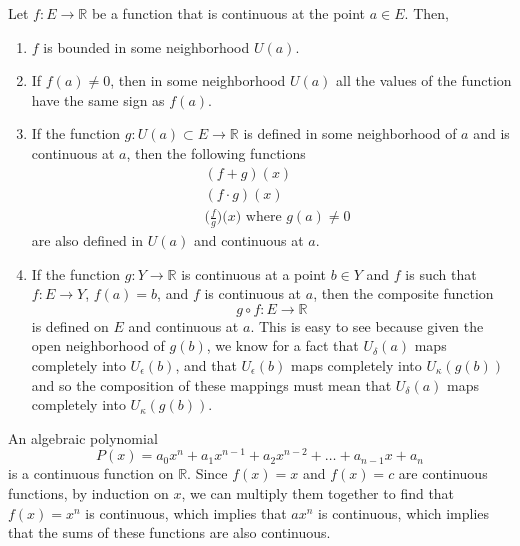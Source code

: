   \begin{theorem}
    Let $f: E \longrightarrow \mathbb{R}$ be a function that is continuous at the point $a \in E$. Then, 
    \begin{enumerate}
      \item $f$ is bounded in some neighborhood $U(a)$. 
      \item If $f(a) \neq 0$, then in some neighborhood $U(a)$ all the values of the function have the same sign as $f(a)$. 
      \item If the function $g: U(a) \subset E \longrightarrow \mathbb{R}$ is defined in some neighborhood of $a$ and is continuous at $a$, then the following functions 
      \begin{align*}
        & (f + g) (x) \\
        & (f \cdot g) (x) \\
        & \bigg( \frac{f}{g} \bigg) \big( x \big) \text{ where } g(a) \neq 0
      \end{align*}
      are also defined in $U(a)$ and continuous at $a$. 
      \item If the function $g: Y \longrightarrow \mathbb{R}$ is continuous at a point $b \in Y$ and $f$ is such that $f: E \longrightarrow Y$, $f(a) = b$, and $f$ is continuous at $a$, then the composite function 
      \[g \circ f: E \longrightarrow \mathbb{R}\]
      is defined on $E$ and continuous at $a$. This is easy to see because given the open neighborhood of $g(b)$, we know for a fact that $U_\delta (a)$ maps completely into $U_\epsilon (b)$, and that $U_\epsilon (b)$ maps completely into $U_\kappa (g(b))$ and so the composition of these mappings must mean that $U_\delta (a)$ maps completely into $U_\kappa (g(b))$. 
    \end{enumerate}
  \end{theorem}

  \begin{example}
    An algebraic polynomial 
    \begin{equation}
      P(x) = a_0 x^n + a_1 x^{n-1} + a_2 x^{n-2} + \ldots + a_{n-1} x + a_n
    \end{equation}
    is a continuous function on $\mathbb{R}$. Since $f(x) = x$ and $f(x) = c$ are continuous functions, by induction on $x$, we can multiply them together to find that $f(x) = x^n$ is continuous, which implies that $a x^n$ is continuous, which implies that the sums of these functions are also continuous. 
  \end{example}

